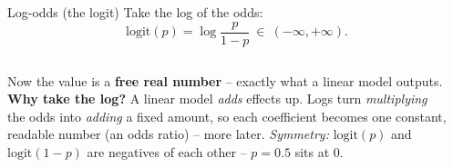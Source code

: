 \documentclass[aspectratio=169]{beamer}
\begin{document}
\begin{frame}{Log-odds (the logit)}
  Take the log of the odds:
  \[
    \mathrm{logit}(p) = \log\!\frac{p}{1-p} \ \in \ (-\infty, +\infty).
  \]
  \begin{columns}[T]
    Now the value is a \textbf{free real number} -- exactly what a linear model
    outputs.
    \vskip 4pt
    \textbf{Why take the log?} A linear model \emph{adds} effects up. Logs turn
    \emph{multiplying} the odds into \emph{adding} a fixed amount, so each coefficient
    becomes one constant, readable number (an odds ratio) -- more later.
    \vskip 4pt
    \footnotesize\emph{Symmetry:} $\mathrm{logit}(p)$ and $\mathrm{logit}(1-p)$ are
    negatives of each other -- $p=0.5$ sits at $0$.
    \begin{center}
    \end{center}
  \end{columns}
\end{frame}
\end{document}
